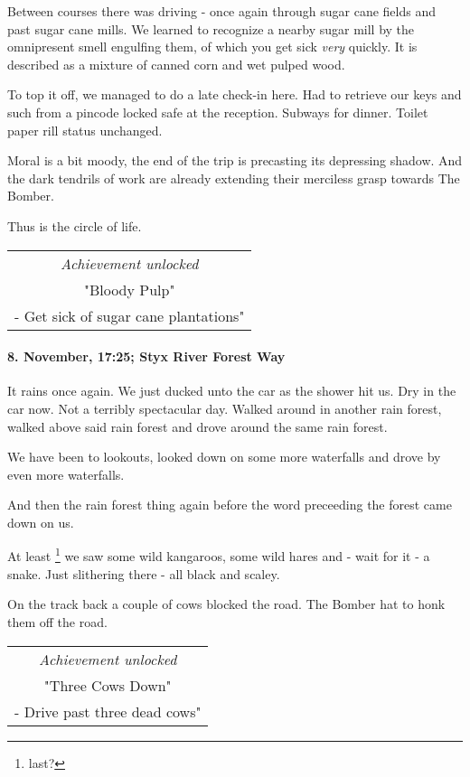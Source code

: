 Between courses there was driving - once again through sugar cane fields and past sugar cane mills.
We learned to recognize a nearby sugar mill by the omnipresent smell engulfing them, of which you get sick \emph{very} quickly.
It is described as a mixture of canned corn and wet pulped wood.

To top it off, we managed to do a late check-in here.
Had to retrieve our keys and such from a pincode locked safe at the reception.
Subways for dinner.
Toilet paper rill status unchanged.

Moral is a bit moody, the end of the trip is precasting its depressing shadow.
And the dark tendrils of work are already extending their merciless grasp towards The Bomber.

Thus is the circle of life.

\begin{center}
\begin{tabular}{||c||}
\emph{Achievement unlocked}\\
"Bloody Pulp"\\
\multicolumn{1}{||p{0.8\textwidth}||}{\footnotesize - Get sick of sugar cane plantations"} \\
\end{tabular}
\end{center}

\paragraph{8. November, 17:25; Styx River Forest Way}
It rains once again.
We just ducked unto the car as the shower hit us.
Dry in the car now.
Not a terribly spectacular day.
Walked around in another rain forest, walked above said rain forest and drove around the same rain forest.

We have been to lookouts, looked down on some more waterfalls and drove by even more waterfalls.

And then the rain forest thing again before the word preceeding the forest came down on us.

At least \footnote{last?} we saw some wild kangaroos, some wild hares and - wait for it - a snake.
Just slithering there - all black and scaley.

On the track back a couple of cows blocked the road.
The Bomber hat to honk them off the road.

\begin{center}
\begin{tabular}{||c||}
\emph{Achievement unlocked}\\
"Three Cows Down"\\
\multicolumn{1}{||p{0.8\textwidth}||}{\footnotesize - Drive past three dead cows"} \\
\end{tabular}
\end{center}

